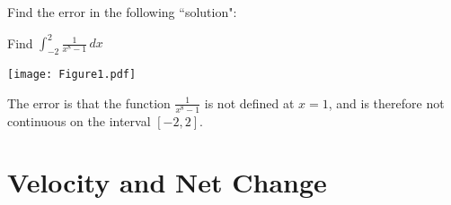 \documentclass[nooutcomes, handout]{ximera}
\renewcommand{\d}{\,d}
\begin{document}
		
		
		
		
		
			
			
	



\newpage



\begin{problem}
Find the error in the following ``solution":

Find $\int_{-2}^2 \frac{1}{x^8 - 1} \d x$

	\begin{image}
	\texttt{[image: Figure1.pdf]}
	\end{image}

	\begin{freeResponse}
	The error is that the function $\frac{1}{x^8-1}$ is not defined at $x=1$, and is therefore not continuous on the interval $[-2,2]$.
	\end{freeResponse}
\end{problem}

\section{Velocity and Net Change}
\end{document}
